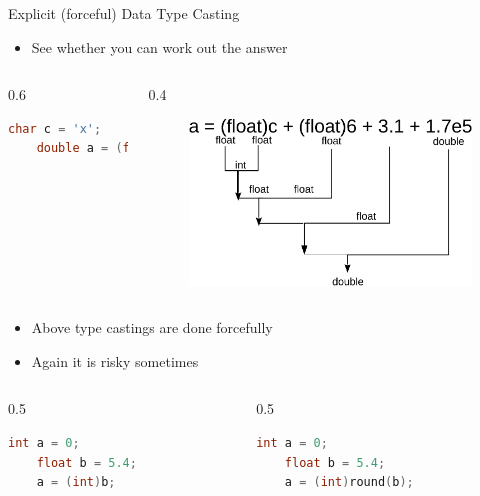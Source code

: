 \begin{frame}[fragile]{Explicit (forceful) Data Type Casting}
\begin{itemize}
	\item {See whether you can work out the answer}
\end{itemize}
\begin{columns}
\begin{column}{0.6\linewidth}
	\begin{lstlisting}[numbers=none, language=c, frame=none]
	char c = 'x';
	double a = (float)c + (float)5 + 1.3 + 1.73e4;
	\end{lstlisting}
\end{column}
\begin{column}{0.4\linewidth}
\begin{figure}
	\includegraphics[width=0.9\linewidth]{figs/cast2.pdf}
\end{figure}
\end{column}
\end{columns}
\begin{itemize}
	\item {Above type castings are done forcefully}
	\item {Again it is risky sometimes}
\end{itemize}
\begin{columns}
\begin{column}{0.5\linewidth}
	\begin{lstlisting}[numbers=none, language=c, frame=none]
	int a = 0;
	float b = 5.4;
	a = (int)b;
	\end{lstlisting}
\end{column}
\begin{column}{0.5\linewidth}
	\begin{lstlisting}[numbers=none, language=c, frame=none]
	int a = 0;
	float b = 5.4;
	a = (int)round(b);
	\end{lstlisting}
\end{column}
\end{columns}
\end{frame}